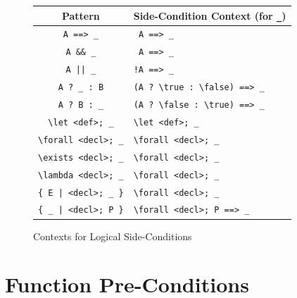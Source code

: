 \begin{figure}[htbp]
  \begin{center}
    \begin{tabular}{|c|l|}
    \hline \textbf{Pattern} & \textbf{Side-Condition Context} (for \verb+_+) \\
    \hline \verb+A ==> _+ & \verb+ A ==> _+ \\
    \hline \verb+A && _+ & \verb+ A ==> _+ \\
    \hline \verb+A || _+ & \verb+!A ==> _+ \\
    \hline \verb+A ? _ : B+ & \verb+(A ? \true : \false) ==> _+ \\
    \hline \verb+A ? B : _+ & \verb+(A ? \false : \true) ==> _+ \\
    \hline \verb+\let <def>; _+ & \verb+\let <def>; _+ \\
    \hline \verb+\forall <decl>; _+ & \verb+\forall <decl>; _+ \\
    \hline \verb+\exists <decl>; _+ & \verb+\forall <decl>; _+ \\
    \hline \verb+\lambda <decl>; _+ & \verb+\forall <decl>; _+ \\
    \hline \verb+{ E | <decl>; _ }+ & \verb+\forall <decl>; _+ \\
    \hline \verb+{ _ | <decl>; P }+ & \verb+\forall <decl>; P ==> _+ \\
    \hline
    \end{tabular}
  \end{center}
  \caption{Contexts for Logical Side-Conditions}
  \label{fig:logic-context}
\end{figure}


\section{Function Pre-Conditions}
\label{toc:functions}

